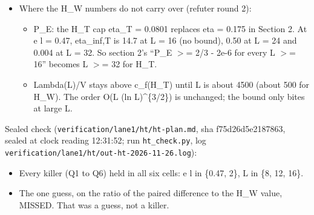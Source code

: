 \documentclass[11pt,a4paper]{article}
\begin{document}
\begin{itemize}
\item{} Where the H\_W numbers do not carry over (refuter round 2):
\begin{itemize}
\item{} P\_E: the H\_T cap eta\_T = 0.0801 replaces eta = 0.175 in Section 2. At e l = 0.47, eta\_inf,T is 14.7 at L = 16 (no
bound), 0.50 at L = 24 and 0.004 at L = 32. So section 2's ``P\_E $>$= 2/3 - 2e-6 for every L $>$= 16'' becomes
L $>$= 32 for H\_T.
\item{} Lambda(L)/V stays above c\_f(H\_T) until L is about 4500 (about 500 for H\_W). The order O(L (ln L)\textasciicircum{}\{3/2\}) is
unchanged; the bound only bites at large L.
\end{itemize}

\end{itemize}

Sealed check (\texttt{verification/\allowbreak{}lane1/\allowbreak{}ht/\allowbreak{}ht-plan.md}, sha f75d26d5e2187863, sealed at clock reading 12:31:52; run \texttt{ht\_check.py}, log
\texttt{verification/\allowbreak{}lane1/\allowbreak{}ht/\allowbreak{}out-ht-2026-11-26.log}):

\begin{itemize}
\item{} Every killer (Q1 to Q6) held in all six cells: e l in \{0.47, 2\}, L in \{8, 12, 16\}.
\item{} The one guess, on the ratio of the paired difference to the H\_W value, MISSED. That was a guess, not a killer.
\end{itemize}
\end{document}

